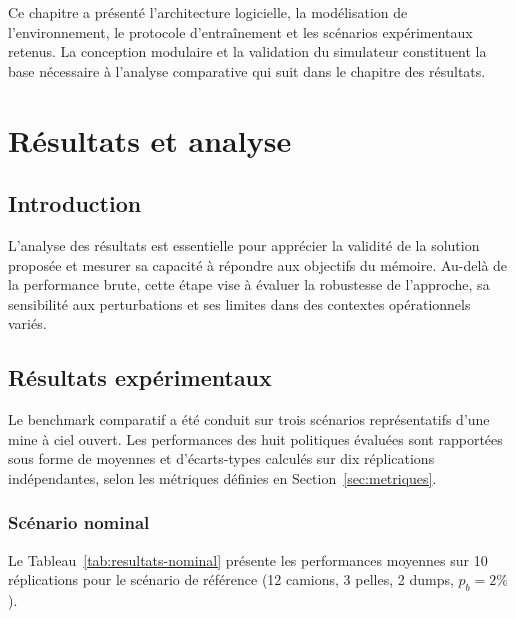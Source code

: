 \documentclass[11pt,a4paper]{report}
\begin{document}
Ce chapitre a présenté l'architecture logicielle, la modélisation de l'environnement, le protocole d'entraînement et les scénarios expérimentaux retenus. La conception modulaire et la validation du simulateur constituent la base nécessaire à l'analyse comparative qui suit dans le chapitre des résultats.

\chapter{Résultats et analyse}
\label{chap:resultats}

\section*{Introduction}

L'analyse des résultats est essentielle pour apprécier la validité de la solution proposée et mesurer sa capacité à répondre aux objectifs du mémoire. Au-delà de la performance brute, cette étape vise à évaluer la robustesse de l'approche, sa sensibilité aux perturbations et ses limites dans des contextes opérationnels variés.

\section{Résultats expérimentaux}
\label{sec:resultats-exp}

Le benchmark comparatif a été conduit sur trois scénarios représentatifs d'une mine à ciel ouvert. Les performances des huit politiques évaluées sont rapportées sous forme de moyennes et d'écarts-types calculés sur dix réplications indépendantes, selon les métriques définies en Section~\ref{sec:metriques}.

\subsection{Scénario nominal}

Le Tableau~\ref{tab:resultats-nominal} présente les performances moyennes sur 10 réplications pour le scénario de référence (12 camions, 3 pelles, 2 dumps, $p_b = 2\%$).
\end{document}
